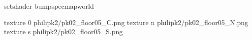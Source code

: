 setshader bumpspecmapworld

texture 0 philipk2/pk02_floor05_C.png
texture n philipk2/pk02_floor05_N.png
texture s philipk2/pk02_floor05_S.png

